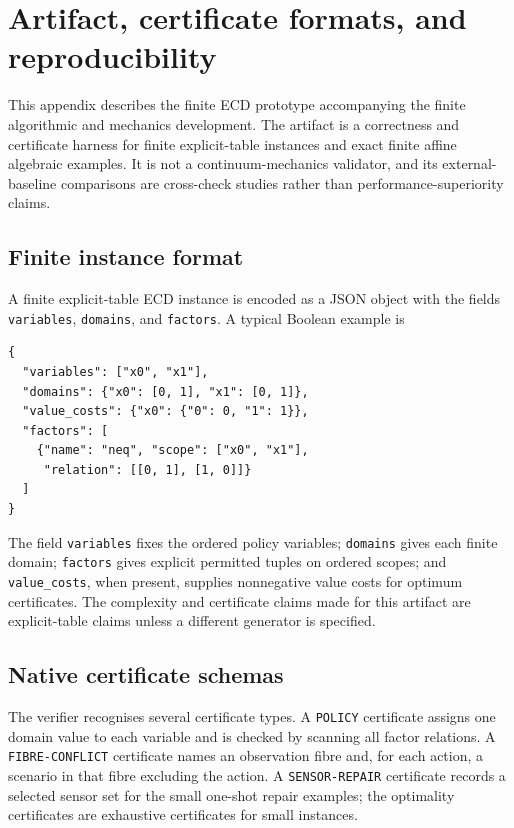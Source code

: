 \appendix
\section{Artifact, certificate formats, and reproducibility}
\label{app:artifact}

This appendix describes the finite ECD prototype accompanying the finite
algorithmic and mechanics development. The artifact is a correctness and
certificate harness for finite explicit-table instances and exact finite affine
algebraic examples. It is not a continuum-mechanics validator, and its
external-baseline comparisons are cross-check studies rather than
performance-superiority claims.

\subsection{Finite instance format}

A finite explicit-table ECD instance is encoded as a JSON object with the fields
\texttt{variables}, \texttt{domains}, and \texttt{factors}. A typical Boolean
example is
\begin{verbatim}
{
  "variables": ["x0", "x1"],
  "domains": {"x0": [0, 1], "x1": [0, 1]},
  "value_costs": {"x0": {"0": 0, "1": 1}},
  "factors": [
    {"name": "neq", "scope": ["x0", "x1"],
     "relation": [[0, 1], [1, 0]]}
  ]
}
\end{verbatim}
The field \texttt{variables} fixes the ordered policy variables; \texttt{domains}
gives each finite domain; \texttt{factors} gives explicit permitted tuples on
ordered scopes; and \texttt{value\_costs}, when present, supplies nonnegative
value costs for optimum certificates. The complexity and certificate claims made
for this artifact are explicit-table claims unless a different generator is
specified.

\subsection{Native certificate schemas}

The verifier recognises several certificate types. A \texttt{POLICY} certificate
assigns one domain value to each variable and is checked by scanning all factor
relations. A \texttt{FIBRE-CONFLICT} certificate names an observation fibre and,
for each action, a scenario in that fibre excluding the action. A
\texttt{SENSOR-REPAIR} certificate records a selected sensor set for the small
one-shot repair examples; the optimality certificates are exhaustive
certificates for small instances.


